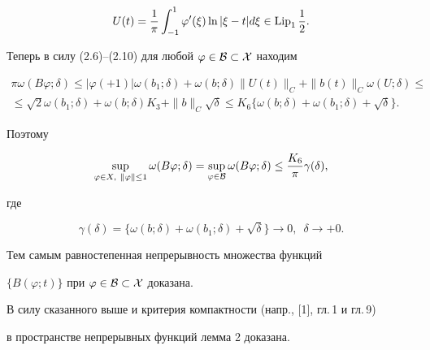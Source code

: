 \begin{pf}
\begin{equation}


U(t)=\frac{1}{\pi}\int_{-1}^1\varphi'(\xi)\ln|\xi-t|d\xi\in \Lip_1


\frac{1}{2}.


\end{equation}


Теперь в силу (2.6)--(2.10) для любой $\varphi\in \cal B\subset X$ находим 


\begin{multline*}


\pi\omega(B\varphi;\delta)\leq|\varphi(+1)|\omega(b_1;\delta)+


\omega(b;\delta)\| U(t)\|_C+\| b(t)\|_C\omega(U;\delta)\leq \\


%


\leq\sqrt{2}\omega(b_1;\delta)+\omega(b;\delta)K_3+\| b\|_C


\sqrt{\delta}\leq K_6\{\omega(b;\delta)+\omega(b_1;\delta)+\sqrt{\delta}\}.


\end{multline*}


Поэтому


\begin{equation}


\sup_{\varphi\in X,\ \|\varphi\|\leq 1}\omega(B\varphi;\delta)=


\sup_{\varphi\in \cal B}\omega(B\varphi;\delta)\leq\frac{K_6}{\pi}


\gamma(\delta),


\end{equation}


где


$$


\gamma(\delta)=\{\omega(b;\delta)+\omega(b_1;\delta)+\sqrt{\delta}\}\to 0,


\ \; \delta\to+0.


$$


Тем самым равностепенная непрерывность множества функций 


$\{B(\varphi;t)\}$ при $\varphi\in \cal B \subset X$ доказана.





В силу сказанного выше и критерия компактности (напр., [1], гл.\,1 и гл.\,9)


в пространстве непрерывных функций лемма 2 доказана.


\end{pf}





